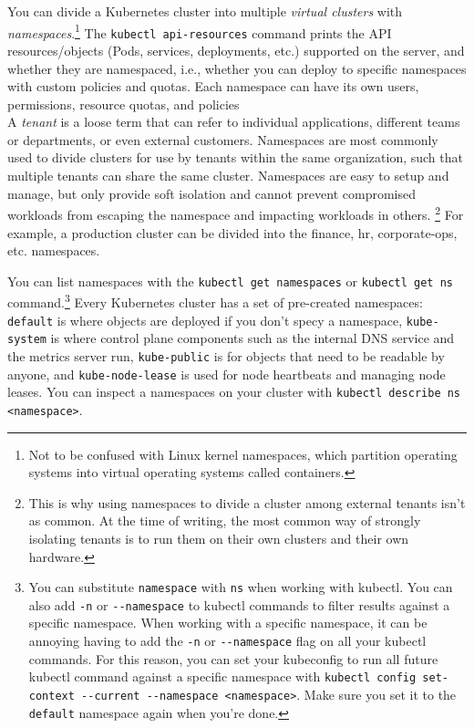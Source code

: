 \documentclass[8pt, table, xcdraw]{article}%
\begin{document}
You can divide a Kubernetes cluster into multiple \emph{virtual clusters} with \emph{namespaces}.\footnote{Not to be confused with Linux kernel namespaces, which partition operating systems into virtual operating systems called containers.} The \lstinline{kubectl api-resources} command prints the API resources/objects (Pods, services, deployments, etc.) supported on the server, and whether they are namespaced, i.e., whether you can deploy to specific namespaces with custom policies and quotas. Each namespace can have its own users, permissions, resource quotas, and policies\\
A \emph{tenant} is a loose term that can refer to individual applications, different teams or departments, or even external customers. Namespaces are most commonly used to divide clusters for use by tenants within the same organization, such that multiple tenants can share the same cluster. Namespaces are easy to setup and manage, but only provide soft isolation and cannot prevent compromised workloads from escaping the namespace and impacting workloads in others. \footnote{This is why using namespaces to divide a cluster among external tenants isn’t as common. At the time of writing, the most common way of strongly isolating tenants is to run them on their own clusters and their own hardware.} For example, a production cluster can be divided into the finance, hr, corporate-ops, etc. namespaces.

You can list namespaces with the \lstinline{kubectl get namespaces} or \lstinline{kubectl get ns} command.\footnote{You can substitute \lstinline{namespace} with \lstinline{ns} when working with kubectl. You can also add \lstinline{-n} or \lstinline{--namespace} to kubectl commands to filter results against a specific namespace. When working with a specific namespace, it can be annoying having to add the \lstinline{-n} or \lstinline{--namespace} flag on all your kubectl commands. For this reason, you can set your kubeconfig to run all future kubectl command against a specific namespace with \lstinline{kubectl config set-context --current --namespace <namespace>}. Make sure you set it to the \lstinline{default} namespace again when you're done.} Every Kubernetes cluster has a set of pre-created namespaces: \lstinline{default} is where objects are deployed if you don't specy a namespace, \lstinline{kube-system} is where control plane components such as the internal DNS service and the metrics server run, \lstinline{kube-public} is for objects that need to be readable by anyone, and \lstinline{kube-node-lease} is used for node heartbeats and managing node leases. You can inspect a namespaces on your cluster with \lstinline{kubectl describe ns <namespace>}.
\end{document}
